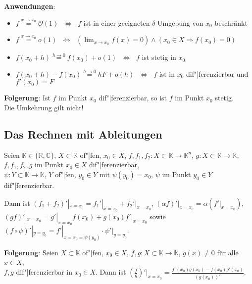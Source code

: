 \linie

\textbf{Anwendungen}:
\begin{itemize}
    \item $f \overset{x \to x_0}{=} \mathcal{O}(1)$
    $\;\Leftrightarrow\;$ $f$ ist in einer geeigneten $\delta$-Umgebung
    von $x_0$ beschränkt
    
    \item $f \overset{x \to x_0}{=} o(1)$
    $\;\Leftrightarrow\;$ $(\lim_{x \to x_0} f(x) = 0) \land
    (x_0 \in X \Rightarrow f(x_0) = 0)$
    
    \item $f(x_0 + h) \overset{h \to 0}{=} f(x_0) + o(1)$
    $\;\Leftrightarrow\;$ $f$ ist stetig in $x_0$
    
    \item $f(x_0 + h) - f(x_0) \overset{h \to 0}{=} hF + o(h)$
    $\;\Leftrightarrow\;$ $f$ ist in $x_0$ dif"|ferenzierbar und $f'(x_0) = F$
\end{itemize}

\textbf{Folgerung}:
Ist $f$ im Punkt $x_0$ dif"|ferenzierbar, so ist $f$ im Punkt $x_0$ stetig. \\
Die Umkehrung gilt nicht!

\subsection{%
    Das Rechnen mit Ableitungen%
}

Seien $\mathbb{K} \in \{\mathbb{R}, \mathbb{C}\}$, $X \subset \mathbb{K}$
of"|fen, $x_0 \in X$, \quad
$f, f_1, f_2: X \subset \mathbb{K} \rightarrow \mathbb{K}^n$,
$g: X \subset \mathbb{K} \rightarrow \mathbb{K}$, \\
$f, f_1, f_2, g$ im Punkt $x_0 \in X$ dif"|ferenzierbar, \\
$\psi: Y \subset \mathbb{K} \rightarrow \mathbb{K}$, $Y$ of"|fen, $y_0 \in Y$
mit $\psi(y_0) = x_0$, $\psi$ im Punkt $y_0 \in Y$ dif"|ferenzierbar.

Dann ist $(f_1 + f_2)'|_{x=x_0} = f_1'|_{x=x_0} + f_2'|_{x=x_0}$, \quad
$(\alpha f)'|_{x=x_0} = \alpha (f'|_{x=x_0})$, \\
$(gf)'|_{x=x_0} = g'|_{x=x_0} f(x_0) + g(x_0) f'|_{x=x_0}$ \quad sowie \quad
$(f \circ \psi)'|_{y=y_0} = f'|_{x=x_0=\psi(y_0)} \cdot \psi'|_{y=y_0}$.

\textbf{Folgerung}: Seien $X \subset \mathbb{K}$ of"|fen, $x_0 \in X$,
$f, g: X \subset \mathbb{K} \rightarrow \mathbb{K}$, $g(x) \not= 0$ für
alle $x \in X$, \\
$f, g$ dif"|ferenzierbar in $x_0 \in X$. \quad
Dann ist {\large $\left(\frac{f}{g}\right)'\Big|_{x=x_0} =
\frac{f'(x_0) g(x_0) - f(x_0) g'(x_0)}{(g(x_0))^2}$}.

